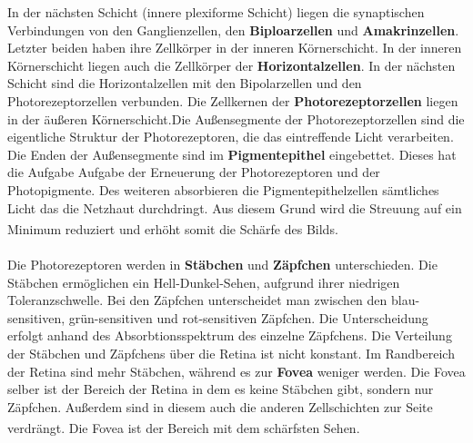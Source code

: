 \documentclass[12pt,a4paper,pdftex]{article}
\begin{document}
In der nächsten Schicht (innere plexiforme Schicht) liegen die synaptischen Verbindungen von den Ganglienzellen, den \textbf{Biploarzellen}  und \textbf{Amakrinzellen}.  Letzter beiden haben ihre Zellkörper in der inneren Körnerschicht. In der inneren Körnerschicht liegen auch die Zellkörper der \textbf{Horizontalzellen}.  In der nächsten Schicht sind die Horizontalzellen mit den Bipolarzellen und den Photorezeptorzellen verbunden. Die Zellkernen der \textbf{Photorezeptorzellen}  liegen in der äußeren Körnerschicht.Die Außensegmente der Photorezeptorzellen sind die eigentliche Struktur der Photorezeptoren, die das eintreffende Licht verarbeiten. Die Enden der Außensegmente sind im \textbf{Pigmentepithel}  eingebettet. Dieses hat die Aufgabe Aufgabe der Erneuerung der Photorezeptoren und der Photopigmente. Des weiteren absorbieren die Pigmentepithelzellen sämtliches Licht das die Netzhaut durchdringt. Aus diesem Grund wird die Streuung auf ein Minimum reduziert und erhöht somit die Schärfe des Bilds. \textsuperscript{\cite[10]{neurowissenschaften_baer}}
\\
\\
\noindent Die Photorezeptoren werden in \textbf{Stäbchen}  und \textbf{Zäpfchen}  unterschieden. Die Stäbchen ermöglichen ein Hell-Dunkel-Sehen, aufgrund ihrer niedrigen Toleranzschwelle. Bei den Zäpfchen unterscheidet man zwischen den blau-sensitiven, grün-sensitiven und rot-sensitiven Zäpfchen. Die Unterscheidung erfolgt anhand des Absorbtionsspektrum des einzelne Zäpfchens. Die Verteilung der Stäbchen und Zäpfchens über die Retina ist nicht konstant. Im Randbereich der Retina sind mehr Stäbchen, während es zur \textbf{Fovea}  weniger werden. Die Fovea selber ist der Bereich der Retina in dem es keine Stäbchen gibt, sondern nur Zäpfchen. Außerdem sind in diesem auch die anderen Zellschichten zur Seite verdrängt. Die Fovea ist der Bereich mit dem schärfsten Sehen. \textsuperscript{\cite[10]{neurowissenschaften_baer}}
\end{document}
